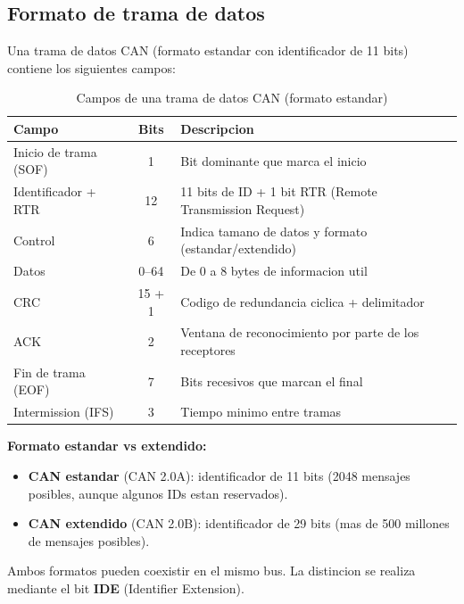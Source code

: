 \subsection{Formato de trama de datos}

Una trama de datos CAN (formato estandar con identificador de 11 bits) contiene
los siguientes campos:

\begin{table}[H]
    \centering
    \caption{Campos de una trama de datos CAN (formato estandar)}
    \label{tab:can_trama}
    \begin{tabular}{|l|c|p{6cm}|}
        \hline
        \textbf{Campo} & \textbf{Bits} & \textbf{Descripcion} \\
        \hline
        Inicio de trama (SOF) & 1 & Bit dominante que marca el inicio \\
        \hline
        Identificador + RTR & 12 & 11 bits de ID + 1 bit RTR (Remote Transmission Request) \\
        \hline
        Control & 6 & Indica tamano de datos y formato (estandar/extendido) \\
        \hline
        Datos & 0--64 & De 0 a 8 bytes de informacion util \\
        \hline
        CRC & 15 + 1 & Codigo de redundancia ciclica + delimitador \\
        \hline
        ACK & 2 & Ventana de reconocimiento por parte de los receptores \\
        \hline
        Fin de trama (EOF) & 7 & Bits recesivos que marcan el final \\
        \hline
        Intermission (IFS) & 3 & Tiempo minimo entre tramas \\
        \hline
    \end{tabular}
\end{table}

\textbf{Formato estandar vs extendido:}

\begin{itemize}
    \item \textbf{CAN estandar} (CAN 2.0A): identificador de 11 bits (2048
    mensajes posibles, aunque algunos IDs estan reservados).
    \item \textbf{CAN extendido} (CAN 2.0B): identificador de 29 bits (mas de 500
    millones de mensajes posibles).
\end{itemize}

Ambos formatos pueden coexistir en el mismo bus. La distincion se realiza
mediante el bit \textbf{IDE} (Identifier Extension).

